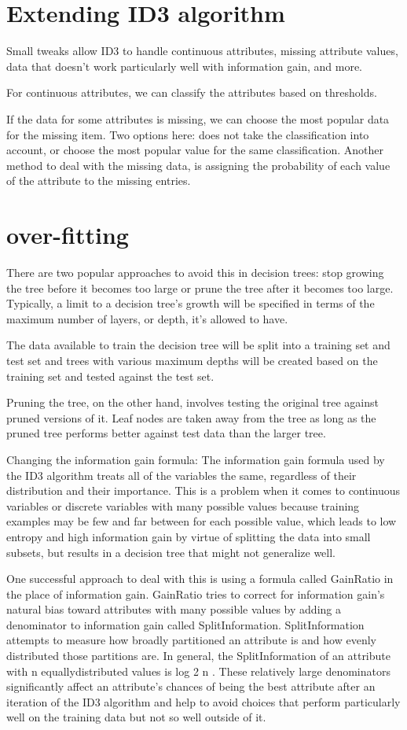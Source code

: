 \documentclass[12pt]{report}
\begin{document}
\section{Extending ID3 algorithm}
Small tweaks allow ID3 to handle continuous attributes, missing attribute values, data that doesn’t work particularly well with
information gain, and more.

For continuous attributes, we can classify the attributes based on thresholds. 

If the data for some attributes is missing, we can choose the most popular data for the missing item. Two options here: does not take the classification into account, or choose the most popular value for the same classification. 
Another method to deal with the missing data, is assigning the probability of each value of the attribute to the missing entries. 


\section{over-fitting}
There are two popular approaches to avoid this in decision trees: stop growing the tree before it becomes too large or prune the tree after it becomes too large. Typically, a limit to a decision tree’s growth will be specified in terms of the maximum number of layers, or depth, it’s allowed to have.

The data available to train the decision tree will be split into a training set and test set and trees with various maximum depths will be created based on the training set and tested against the test set.

Pruning the tree, on the other hand, involves testing the original tree against pruned versions of it. Leaf nodes are taken away from the tree as long as the pruned tree performs better against test data than the larger tree.


Changing the information gain formula:
The information gain formula used by the ID3 algorithm treats all of the variables the same, regardless of their distribution and their importance. This is a problem when it comes to continuous variables or discrete variables with many possible values because training examples may be few and far between for each possible value, which leads to low entropy and high information gain by virtue of splitting the data into small subsets, but results in a decision tree that might not generalize well.

One successful approach to deal with this is using a formula called GainRatio in the place of information gain. GainRatio tries to correct for information gain’s natural bias toward attributes with many possible values by adding a denominator to information gain called SplitInformation. SplitInformation attempts to measure how broadly partitioned an attribute is and how evenly distributed those partitions are. In general, the SplitInformation of an attribute with n equally­distributed values is log 2 n . These relatively large denominators significantly affect an attribute’s chances of being the best attribute after an iteration of the ID3 algorithm and help to avoid choices that perform particularly well on the training data but not so well outside of it.
\end{document}
